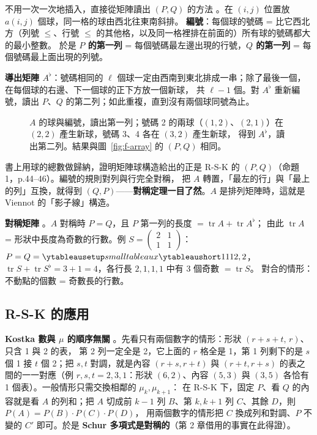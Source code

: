 不用一次一次地插入，直接從矩陣讀出 $(P,Q)$ 的方法 。在 $(i,j)$ 位置放 $a(i,j)$ 個球，同一格的球由西北往東南斜排。
\textbf{編號}：每個球的號碼 = 比它西北方（列號 $\le$、行號 $\le$ 的其他格，以及同一格裡排在前面的）所有球的號碼都大的最小整數。
於是 \textbf{$P$ 的第一列} = 每個號碼最左邊出現的行號，\textbf{$Q$ 的第一列} = 每個號碼最上面出現的列號。

\textbf{導出矩陣 $A^\flat$}：號碼相同的 $\ell$ 個球一定由西南到東北排成一串；除了最後一個，在每個球的右邊、下一個球的正下方放一個新球，
共 $\ell-1$ 個。對 $A^\flat$ 重新編號，讀出 $P$、$Q$ 的第二列；如此重複，直到沒有兩個球同號為止。

\begin{figure}[H]
\centering
\FulBalls
\caption{$A$ 的球與編號，讀出第一列；號碼 2 的兩球（$(1,2)$、$(2,1)$）在 $(2,2)$ 產生新球，號碼 3、4 各在 $(3,2)$ 產生新球，
得到 $A^\flat$，讀出第二列。結果與圖~\ref{fig:f-array} 的 $(P,Q)$ 相同。}
\label{fig:f-balls}
\end{figure}

書上用球的總數做歸納，證明矩陣球構造給出的正是 R-S-K 的 $(P,Q)$（命題 1，p.44--46）。編號的規則對列與行完全對稱，
把 $A$ 轉置，「最左的行」與「最上的列」互換，就得到 $(Q,P)$——\textbf{對稱定理一目了然}。$A$ 是排列矩陣時，這就是 Viennot 的「影子線」構造。

\textbf{對稱矩陣} 。$A$ 對稱時 $P=Q$，且 $P$ 第一列的長度 $=\operatorname{tr}A+\operatorname{tr}A^\flat$；
由此 $\operatorname{tr}A$ = 形狀中長度為奇數的行數。例 $S=\left(\begin{smallmatrix}2&1\\1&1\end{smallmatrix}\right)$：
$P=Q=\yts{1112,2}$，$\operatorname{tr}S+\operatorname{tr}S^\flat=3+1=4$，各行長 $2,1,1,1$ 中有 3 個奇數 $=\operatorname{tr}S$。
對合的情形：不動點的個數 = 奇數長的行數。

\subsection{R-S-K 的應用}\label{sec:f-apps}

\textbf{Kostka 數與 $\mu$ 的順序無關} 。先看只有兩個數字的情形：形狀 $(r+s+t,\,r)$、只含 1 與 2 的表，
第 2 列一定全是 2，它上面的 $r$ 格全是 1，第 1 列剩下的是 $s$ 個 1 接 $t$ 個 2；把 $s,t$ 對調，就是內容 $(r+s,r+t)$ 與 $(r+t,r+s)$
的表之間的一一對應（例 $r,s,t=2,3,1$：形狀 $(6,2)$、內容 $(5,3)$ 與 $(3,5)$ 各恰有 1 個表）。一般情形只需交換相鄰的 $\mu_k,\mu_{k+1}$：
在 R-S-K 下，固定 $P$、看 $Q$ 的內容就是看 $A$ 的列和；把 $A$ 切成前 $k-1$ 列 $B$、第 $k,k+1$ 列 $C$、其餘 $D$，則 $P(A)=P(B)\cdot P(C)\cdot P(D)$，
用兩個數字的情形把 $C$ 換成列和對調、$P$ 不變的 $C'$ 即可。於是 \textbf{Schur 多項式是對稱的}（第 2 章借用的事實在此得證）。

